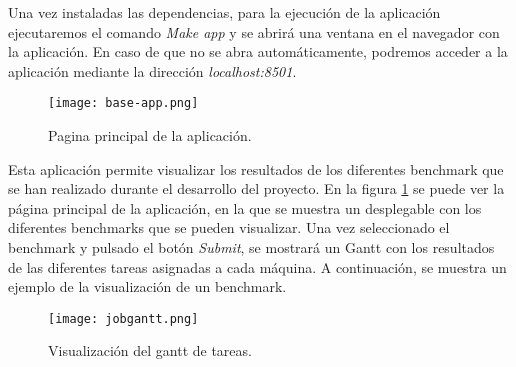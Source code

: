 Una vez instaladas las dependencias, para la ejecución de la aplicación
ejecutaremos el comando \textit{Make app} y se abrirá una ventana en el
navegador con la aplicación. En caso de que no se abra automáticamente,
podremos acceder a la aplicación mediante la dirección \textit{localhost:8501}.

\begin{figure}[ht]
    \centering
    \texttt{[image: base-app.png]}
    \caption{Pagina principal de la aplicación.}
    \label{fig:demo}
\end{figure}

Esta aplicación permite visualizar los resultados de los diferentes
benchmark que se han realizado durante el desarrollo del proyecto. En la
figura \ref{fig:demo} se puede ver la página principal de la aplicación,
en la que se muestra un desplegable con los diferentes benchmarks que se
pueden visualizar. Una vez seleccionado el benchmark y pulsado el botón
\textit{Submit}, se mostrará un Gantt con los resultados de las diferentes
tareas asignadas a cada máquina. A continuación, se muestra un ejemplo de
la visualización de un benchmark.

\begin{figure}[ht]
    \centering
    \texttt{[image: jobgantt.png]}
    \caption{Visualización del gantt de tareas.}
    \label{fig:demo-2}
\end{figure}

\pagebreak
